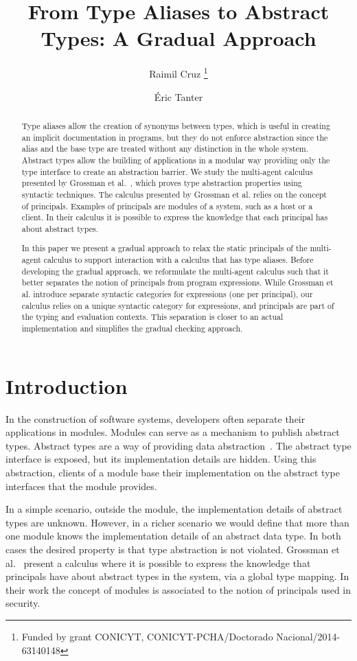 \documentclass{article}
\title{\bf From Type Aliases to Abstract Types: A Gradual Approach}
\author{Raimil Cruz
\thanks{Funded by grant CONICYT, CONICYT-PCHA/Doctorado Nacional/2014-63140148}}
\author{{\'E}ric Tanter}
\affil{Computer Science Department (DCC), University of Chile, Chile}
\date{}
\begin{document}
	\maketitle
	\renewcommand{\abstractname}{Abstract}	
	\begin{abstract}
	Type aliases allow the creation of synonyms between types, which is useful in creating an implicit documentation in programs, but they do not enforce abstraction since the alias and the base type are treated without any distinction in the whole system. Abstract types allow the building of applications in a modular way providing only the type interface to create an abstraction barrier. We study the multi-agent calculus presented by Grossman et al.~\cite{grossmanAl:toplas2000}, which proves type abstraction properties using syntactic techniques. The calculus presented by Grossman et al. relies on the concept of principals. Examples of principals are modules of a system, such as a host or a client. In their calculus it is possible to express the knowledge that each principal has about abstract types.
	
	In this paper we present a gradual approach to relax the static principals of the multi-agent calculus to support interaction with a calculus that has type aliases. Before developing the gradual approach, we reformulate the multi-agent calculus such that it better separates the notion of principals from program expressions. While Grossman et al. introduce separate syntactic categories for expressions (one per principal), our calculus relies on a unique syntactic category for expressions, and principals are part of the typing and evaluation contexts. This separation is closer to an actual implementation and simplifies the gradual checking approach. 
	\end{abstract}	
	\section{Introduction}
	In the construction of software systems, developers often separate their applications in modules. Modules can serve as a mechanism to publish abstract types. Abstract types are a way of providing data abstraction~\cite{cook:onward2009}. The abstract type interface is exposed, but its implementation details are hidden. Using this abstraction, clients of a module base their implementation on the abstract type interfaces that the module provides. 
	
	In a simple scenario, outside the module, the implementation details of abstract types are unknown. However, in a richer scenario we would define that more than one module knows the implementation details of an abstract data type. In both cases the desired property is that type abstraction is not violated. Grossman et al.~\cite{grossmanAl:toplas2000} present a calculus where it is possible to express the knowledge that principals have about abstract types in the system, via a global type mapping. In their work the concept of modules is associated to the notion of principals used in security.
	
\end{document}
